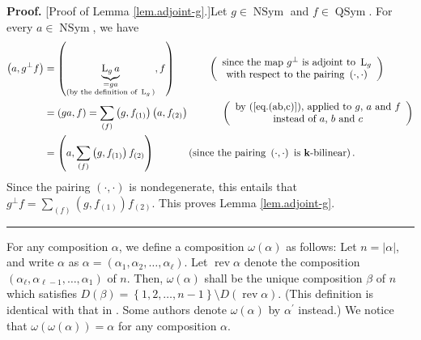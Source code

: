 \documentclass[numbers=enddot,12pt,final,onecolumn,notitlepage,abstracton]{scrartcl}%
\theoremstyle{definition}
\newenvironment{proof}[1][Proof]{\noindent\textbf{#1.} }{\ \rule{0.5em}{0.5em}}
\newenvironment{verlong}{}{}
\let\sumnonlimits\sum
\renewcommand{\sum}{\sumnonlimits\limits}
\begin{document}
\begin{verlong}
\begin{proof}
[Proof of Lemma \ref{lem.adjoint-g}.]Let $g\in\operatorname*{NSym}$ and
$f\in\operatorname*{QSym}$. For every $a\in\operatorname*{NSym}$, we have%
\begin{align*}
\left(  a,g^{\perp}f\right)   &  =\left(  \underbrace{\operatorname*{L}%
\nolimits_{g}a}_{\substack{=ga\\\text{(by the definition of }\operatorname*{L}%
\nolimits_{g}\text{)}}},f\right)  \ \ \ \ \ \ \ \ \ \ \left(
\begin{array}
[c]{c}%
\text{since the map }g^{\perp}\text{ is adjoint to }\operatorname*{L}%
\nolimits_{g}\\
\text{with respect to the pairing }\left(  \cdot,\cdot\right)
\end{array}
\right) \\
&  =\left(  ga,f\right)  =\sum_{\left(  f\right)  }\left(  g,f_{\left(
1\right)  }\right)  \left(  a,f_{\left(  2\right)  }\right)
\ \ \ \ \ \ \ \ \ \ \left(
\begin{array}
[c]{c}%
\text{by (\ref{eq.(ab,c)}), applied to }g\text{, }a\text{ and }f\\
\text{instead of }a\text{, }b\text{ and }c
\end{array}
\right) \\
&  =\left(  a,\sum_{\left(  f\right)  }\left(  g,f_{\left(  1\right)
}\right)  f_{\left(  2\right)  }\right)  \ \ \ \ \ \ \ \ \ \ \left(
\text{since the pairing }\left(  \cdot,\cdot\right)  \text{ is }%
\mathbf{k}\text{-bilinear}\right)  .
\end{align*}
Since the pairing $\left(  \cdot,\cdot\right)  $ is nondegenerate, this
entails that $g^{\perp}f=\sum_{\left(  f\right)  }\left(  g,f_{\left(
1\right)  }\right)  f_{\left(  2\right)  }$. This proves Lemma
\ref{lem.adjoint-g}.
\end{proof}
\end{verlong}

For any composition $\alpha$, we define a composition $\omega\left(
\alpha\right)  $ as follows: Let $n=\left\vert \alpha\right\vert $, and write
$\alpha$ as $\alpha=\left(  \alpha_{1},\alpha_{2},\ldots,\alpha_{\ell}\right)
$. Let $\operatorname*{rev}\alpha$ denote the composition $\left(
\alpha_{\ell},\alpha_{\ell-1},\ldots,\alpha_{1}\right)  $ of $n$. Then,
$\omega\left(  \alpha\right)  $ shall be the unique composition $\beta$ of $n$
which satisfies $D\left(  \beta\right)  =\left\{  1,2,\ldots,n-1\right\}
\setminus D\left(  \operatorname*{rev}\alpha\right)  $. (This definition is
identical with that in \cite[Definition 5.2.14]{Reiner}. Some authors denote
$\omega\left(  \alpha\right)  $ by $\alpha^{\prime}$ instead.) We notice that
$\omega\left(  \omega\left(  \alpha\right)  \right)  =\alpha$ for any
composition $\alpha$.
\end{document}
